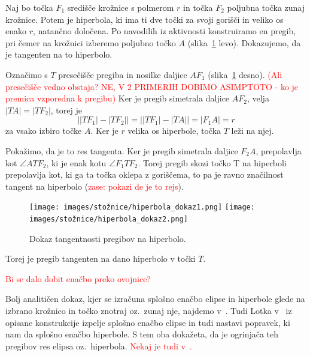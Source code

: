 \begin{dokaz}
    Naj bo točka $F_1$ središče krožnice s polmerom $r$ in točka $F_2$ poljubna točka zunaj krožnice. Potem je hiperbola, ki ima ti dve točki za svoji gorišči in veliko os enako $r$, natančno določena. Po navodilih iz aktivnosti konstruiramo en pregib, pri čemer na krožnici izberemo poljubno točko $A$ (slika~\ref{fig:dokaz_hiperbola} levo). Dokazujemo, da je tangenten na to hiperbolo.

    Označimo s $T$ presečišče pregiba in nosilke daljice $AF_1$ (slika~\ref{fig:dokaz_hiperbola} desno). \textcolor{red}{(Ali presečišče vedno obstaja? NE, V 2 PRIMERIH DOBIMO ASIMPTOTO - ko je premica vzporedna k pregibu)} Ker je pregib simetrala daljice $AF_2$, velja $|TA| = |TF_2|$, torej je 
    $$\left||TF_1| - |TF_2|\right| = \left||TF_1| - |TA|\right| = |F_1A| = r$$
    za vsako izbiro točke $A$. Ker je $r$ velika os hiperbole, točka $T$ leži na njej.

    Pokažimo, da je to res tangenta. Ker je pregib simetrala daljice $F_2A$,  prepolavlja kot $\angle ATF_2$, ki je enak kotu $\angle F_1TF_2$. Torej pregib skozi točko T na hiperboli prepolavlja kot, ki ga ta točka oklepa z goriščema, to pa je ravno značilnost tangent na hiperbolo (\textcolor{red}{zase: pokazi de je to rejs}).

    \begin{figure}[h]
        \centering
        \texttt{[image: images/stožnice/hiperbola\_dokaz1.png]}
        \texttt{[image: images/stožnice/hiperbola\_dokaz2.png]}
        \caption[Tangentnost na hiperbolo]{Dokaz tangentnosti pregibov na hiperbolo.}
        \label{fig:dokaz_hiperbola}
    \end{figure}
    Torej je pregib tangenten na dano hiperbolo v točki $T$.
\end{dokaz}

\textcolor{red}{Bi se dalo dobit enačbo preko ovojnice?}

Bolj analitičen dokaz, kjer se izračuna splošno enačbo elipse in hiperbole glede na izbrano krožnico in točko znotraj oz.\ zunaj nje, najdemo v~\cite[str.\ 204--206]{smith2003}. Tudi Lotka v~\cite{lotka1907} iz opisane konstrukcije izpelje splošno enačbo elipse in tudi nastavi popravek, ki nam da splošno enačbo hiperbole. S tem oba dokažeta, da je ogrinjača teh pregibov res elipsa oz.\ hiperbola.
\textcolor{red}{Nekaj je tudi v~\cite[str.\ 34 spodaj]{hull2020}.}